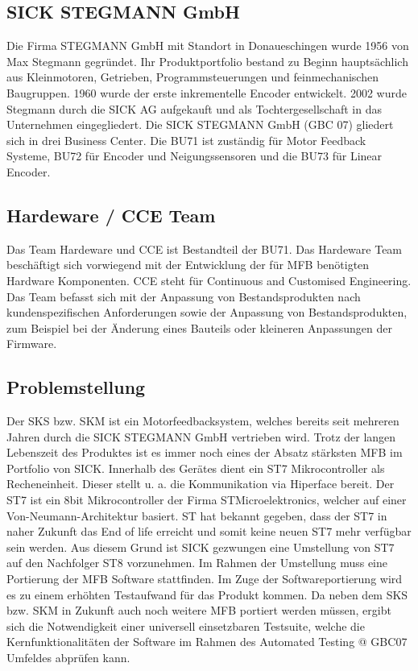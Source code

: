 		\subsection{SICK STEGMANN GmbH}
		Die Firma STEGMANN GmbH mit Standort in Donaueschingen wurde 1956 von Max Stegmann gegründet. Ihr Produktportfolio bestand zu Beginn hauptsächlich aus Kleinmotoren, Getrieben, Programmsteuerungen und feinmechanischen Baugruppen. 1960 wurde der erste inkrementelle Encoder entwickelt. 2002 wurde Stegmann durch die SICK AG aufgekauft und als Tochtergesellschaft in das Unternehmen eingegliedert.
Die SICK STEGMANN GmbH (GBC 07) gliedert sich in drei Business Center. 
Die BU71 ist zuständig für Motor Feedback Systeme, BU72 für Encoder und Neigungssensoren und die BU73 für Linear Encoder.\cite{SICKAG.2020}
		\subsection{Hardeware / CCE Team}
		Das Team Hardeware und \ac{CCE} ist Bestandteil der BU71. Das Hardeware Team beschäftigt sich vorwiegend mit der Entwicklung der für \ac{MFB} benötigten Hardware Komponenten. \ac{CCE} steht für Continuous and Customised Engineering. Das Team befasst sich mit der Anpassung von Bestandsprodukten nach kundenspezifischen Anforderungen sowie der Anpassung von Bestandsprodukten, zum Beispiel bei der Änderung eines Bauteils oder kleineren Anpassungen der Firmware.
	\subsection{Problemstellung}
	Der SKS bzw. SKM ist ein Motorfeedbacksystem, welches bereits seit mehreren Jahren durch die SICK STEGMANN GmbH vertrieben wird. Trotz der langen Lebenszeit des Produktes ist es immer noch eines der Absatz stärksten \ac{MFB} im Portfolio von SICK. Innerhalb des Gerätes dient ein ST7 Mikrocontroller als Recheneinheit. Dieser stellt u. a. die Kommunikation via Hiperface bereit. Der ST7 ist ein 8bit Mikrocontroller der Firma STMicroelektronics, welcher auf einer Von-Neumann-Architektur basiert\cite{mikrocontroller.net.2009}. ST hat bekannt gegeben, dass der ST7 in naher Zukunft das End of life erreicht und somit keine neuen ST7 mehr verfügbar sein werden. Aus diesem Grund ist SICK gezwungen eine Umstellung von ST7 auf den Nachfolger ST8 vorzunehmen. Im Rahmen der Umstellung muss eine Portierung der \ac{MFB} Software stattfinden. Im Zuge der Softwareportierung wird es zu einem erhöhten Testaufwand für das Produkt kommen. Da neben dem SKS bzw. SKM in Zukunft auch noch weitere \ac{MFB} portiert werden müssen, ergibt sich die Notwendigkeit einer universell einsetzbaren Testsuite, welche die Kernfunktionalitäten der Software im Rahmen des Automated Testing @ GBC07 Umfeldes abprüfen kann. 
